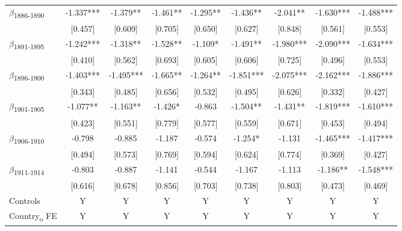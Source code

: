 {\begin{tabular}{l*{8}{c}}
$\beta$\textsubscript{1886-1890}&      -1.337***&      -1.379** &      -1.461** &      -1.295** &      -1.436** &      -2.041** &      -1.630***&      -1.488***\\
            &     [0.457]   &     [0.609]   &     [0.705]   &     [0.650]   &     [0.627]   &     [0.848]   &     [0.561]   &     [0.553]   \\
$\beta$\textsubscript{1891-1895}&      -1.242***&      -1.318** &      -1.528** &      -1.109*  &      -1.491** &      -1.980***&      -2.090***&      -1.634***\\
            &     [0.410]   &     [0.562]   &     [0.693]   &     [0.605]   &     [0.606]   &     [0.725]   &     [0.496]   &     [0.553]   \\
$\beta$\textsubscript{1896-1900}&      -1.403***&      -1.495***&      -1.665** &      -1.264** &      -1.851***&      -2.075***&      -2.162***&      -1.886***\\
            &     [0.343]   &     [0.485]   &     [0.656]   &     [0.532]   &     [0.495]   &     [0.626]   &     [0.332]   &     [0.427]   \\
$\beta$\textsubscript{1901-1905}&      -1.077** &      -1.163** &      -1.426*  &      -0.863   &      -1.504** &      -1.431** &      -1.819***&      -1.610***\\
            &     [0.423]   &     [0.551]   &     [0.779]   &     [0.577]   &     [0.559]   &     [0.671]   &     [0.453]   &     [0.494]   \\
$\beta$\textsubscript{1906-1910}&      -0.798   &      -0.885   &      -1.187   &      -0.574   &      -1.254*  &      -1.131   &      -1.465***&      -1.417***\\
            &     [0.494]   &     [0.573]   &     [0.769]   &     [0.594]   &     [0.624]   &     [0.774]   &     [0.369]   &     [0.427]   \\
$\beta$\textsubscript{1911-1914}&      -0.803   &      -0.887   &      -1.141   &      -0.544   &      -1.167   &      -1.113   &      -1.186** &      -1.548***\\
            &     [0.616]   &     [0.678]   &     [0.856]   &     [0.703]   &     [0.738]   &     [0.803]   &     [0.473]   &     [0.469]   \\
Controls    &           Y   &           Y   &           Y   &           Y   &           Y   &           Y   &           Y   &           Y   \\
Country\textsubscript{o} FE&           Y   &           Y   &           Y   &           Y   &           Y   &           Y   &           Y   &           Y   \\

\end{tabular}}
